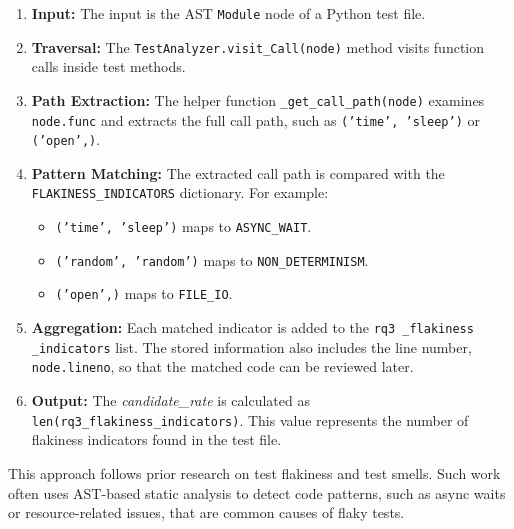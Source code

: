\documentclass[conference]{IEEEtran}
\begin{document}
\begin{enumerate}
    \item \textbf{Input:} The input is the AST \texttt{Module} node of a Python test file.

    \item \textbf{Traversal:} The \texttt{TestAnalyzer.visit\_Call(node)} method visits function calls inside test methods.

    \item \textbf{Path Extraction:} The helper function \texttt{\_get\_call\_path(node)} examines \texttt{node.func} and extracts the full call path, such as \texttt{('time', 'sleep')} or \texttt{('open',)}.

    \item \textbf{Pattern Matching:} The extracted call path is compared with the \texttt{FLAKINESS\_INDICATORS} dictionary. For example:
    \begin{itemize}
        \item \texttt{('time', 'sleep')} maps to \texttt{ASYNC\_WAIT}.
        \item \texttt{('random', 'random')} maps to \texttt{NON\_DETERMINISM}.
        \item \texttt{('open',)} maps to \texttt{FILE\_IO}.
    \end{itemize}

    \item \textbf{Aggregation:} Each matched indicator is added to the \texttt{rq3 \_flakiness \_indicators} list. The stored information also includes the line number, \texttt{node.lineno}, so that the matched code can be reviewed later.

    \item \textbf{Output:} The \textit{candidate\_rate} is calculated as \texttt{len(rq3\_flakiness\_indicators)}. This value represents the number of flakiness indicators found in the test file.
\end{enumerate}

This approach follows prior research on test flakiness and test smells. Such work often uses AST-based static analysis to detect code patterns, such as async waits or resource-related issues, that are common causes of flaky tests.
\end{document}
